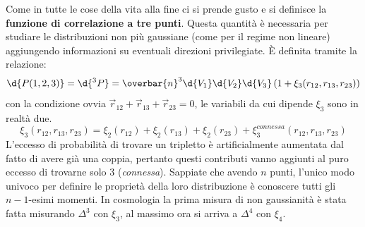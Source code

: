 \vspace{1em}
Come in tutte le cose della vita alla fine ci si prende gusto e si definisce la \textbf{funzione di correlazione a tre punti}. Questa quantità è necessaria per studiare le distribuzioni non più gaussiane (come per il regime non lineare) aggiungendo informazioni su eventuali direzioni privilegiate. È definita tramite la relazione:
\begin{equation}
    \d{P(1,2,3)}=\d{^3 P}= \overbar{n}^3 \d{V_1}\d{V_2}\d{V_3}\left(1+\xi_3 (r_{12}, r_{13},r_{23})\right)
\end{equation}
con la condizione ovvia $\vec{r}_{12}+ \vec{r}_{13}+\vec{r}_{23}=0$, le variabili da cui dipende $\xi_3$ sono in realtà due. 
\begin{equation}
    \xi_3 (r_{12}, r_{13}, r_{23}) = \xi_2(r_{12}) + \xi_2(r_{13}) + \xi_2(r_{23})+\xi_3^{connessa} (r_{12}, r_{13}, r_{23})
\end{equation}
L'eccesso di probabilità di trovare un tripletto è artificialmente aumentata dal fatto di avere già una coppia, pertanto questi contributi vanno aggiunti al puro eccesso di trovarne solo 3 (\textit{connessa}). Sappiate che avendo $n$ punti, l'unico modo univoco per definire le proprietà della loro distribuzione è conoscere tutti gli $n-1$-esimi momenti. In cosmologia la prima misura di non gaussianità è stata fatta misurando $\Delta^3$ con  $\xi_3$, al massimo ora si arriva a $\Delta^4$ con  $\xi_4$.

